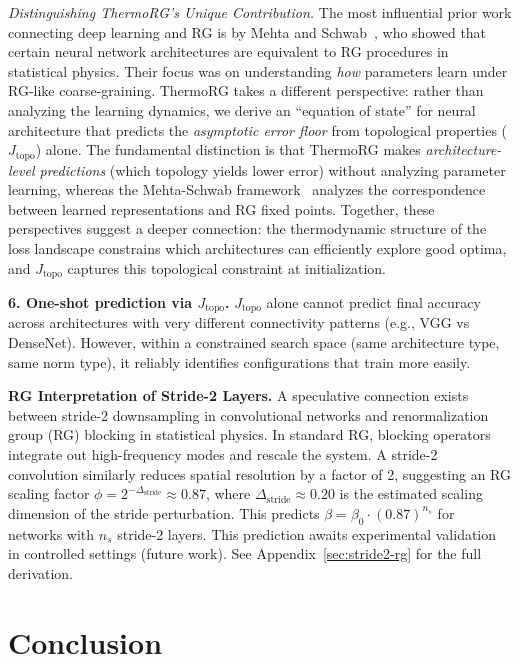 \documentclass[11pt, a4paper]{article}
\theoremstyle{plain}
\begin{document}
\medskip
\noindent\textit{Distinguishing ThermoRG's Unique Contribution.} The most influential prior work connecting deep learning and RG is by Mehta and Schwab~\citep{mehta2014exact}, who showed that certain neural network architectures are equivalent to RG procedures in statistical physics. Their focus was on understanding \emph{how} parameters learn under RG-like coarse-graining. ThermoRG takes a different perspective: rather than analyzing the learning dynamics, we derive an ``equation of state'' for neural architecture that predicts the \emph{asymptotic error floor} from topological properties ($J_{\mathrm{topo}}$) alone. The fundamental distinction is that ThermoRG makes \emph{architecture-level predictions} (which topology yields lower error) without analyzing parameter learning, whereas the Mehta-Schwab framework~\citep{mehta2014exact} analyzes the correspondence between learned representations and RG fixed points. Together, these perspectives suggest a deeper connection: the thermodynamic structure of the loss landscape constrains which architectures can efficiently explore good optima, and $J_{\mathrm{topo}}$ captures this topological constraint at initialization.

\medskip
\noindent\textbf{6. One-shot prediction via $J_{\mathrm{topo}}$.} $J_{\mathrm{topo}}$ alone cannot predict final accuracy across architectures with very different connectivity patterns (e.g., VGG vs DenseNet). However, within a constrained search space (same architecture type, same norm type), it reliably identifies configurations that train more easily.

\medskip
\noindent\textbf{RG Interpretation of Stride-2 Layers.} A speculative connection exists between stride-2 downsampling in convolutional networks and renormalization group (RG) blocking in statistical physics. In standard RG, blocking operators integrate out high-frequency modes and rescale the system. A stride-2 convolution similarly reduces spatial resolution by a factor of 2, suggesting an RG scaling factor $\phi = 2^{-\Delta_{\mathrm{stride}}} \approx 0.87$, where $\Delta_{\mathrm{stride}} \approx 0.20$ is the estimated scaling dimension of the stride perturbation. This predicts $\beta = \beta_0 \cdot (0.87)^{n_s}$ for networks with $n_s$ stride-2 layers. This prediction awaits experimental validation in controlled settings (future work). See Appendix~\ref{sec:stride2-rg} for the full derivation.

\section{Conclusion}\label{sec:conclusions}
\end{document}
